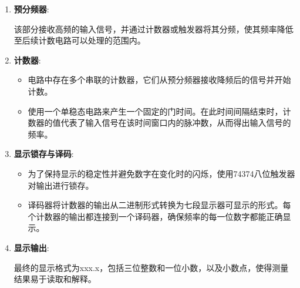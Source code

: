 \documentclass[UTF8,titlepage,a4paper]{ctexart}
\numberwithin{figure}{section}
\begin{document}
\begin{enumerate}
    \item \textbf{预分频器}:
    
    该部分接收高频的输入信号，并通过计数器或触发器将其分频，使其频率降低至后续计数电路可以处理的范围内。
    
    \item \textbf{计数器}:
    \begin{itemize}
        \item 电路中存在多个串联的计数器，它们从预分频器接收降频后的信号并开始计数。
        \item 使用一个单稳态电路来产生一个固定的门时间。在此时间间隔结束时，计数器的值代表了输入信号在该时间窗口内的脉冲数，从而得出输入信号的频率。
    \end{itemize}
    
    \item \textbf{显示锁存与译码}:
    \begin{itemize}
        \item 为了保持显示的稳定性并避免数字在变化时的闪烁，使用74374八位触发器对输出进行锁存。
        \item 译码器将计数器的输出从二进制形式转换为七段显示器可显示的形式。每个计数器的输出都连接到一个译码器，确保频率的每一位数字都能正确显示。
    \end{itemize}
    
    \item \textbf{显示输出}:
    
    最终的显示格式为xxx.x，包括三位整数和一位小数，以及小数点，使得测量结果易于读取和解释。


\end{enumerate}
\end{document}
